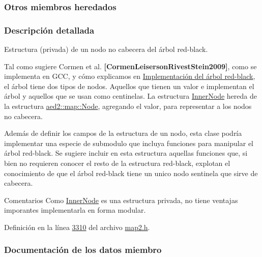 \subsubsection*{Otros miembros heredados}


\subsubsection{Descripción detallada}
Estructura (privada) de un nodo no cabecera del árbol red-\/black. 

Tal como sugiere Cormen et al. {\bfseries [Cormen\+Leiserson\+Rivest\+Stein2009]}, como se implementa en G\+CC, y cómo explicamos en \hyperlink{Implementacion}{Implementación del árbol red-\/black}, el árbol tiene dos tipos de nodos. Aquellos que tienen un valor e implementan el árbol y aquellos que se usan como centinelas. La estructura \hyperlink{structaed2_1_1iterator_1_1InnerNode}{Inner\+Node} hereda de la estructura \hyperlink{structaed2_1_1map_1_1Node}{aed2\+::map\+::\+Node}, agregando el valor, para representar a los nodos no cabecera.

Además de definir los campos de la estructura de un nodo, esta clase podría implementar una especie de submodulo que incluya funciones para manipular el árbol red-\/black. Se sugiere incluir en esta estructura aquellas funciones que, si bien no requieren conocer el resto de la estructura red-\/black, explotan el conocimiento de que el árbol red-\/black tiene un unico nodo sentinela que sirve de cabecera.

\begin{DoxyRemark}{Comentarios}
Como \hyperlink{structaed2_1_1iterator_1_1InnerNode}{Inner\+Node} es una estructura privada, no tiene ventajas imporantes implementarla en forma modular. 
\end{DoxyRemark}


Definición en la línea \hyperlink{map2_8h_source_l03310}{3310} del archivo \hyperlink{map2_8h_source}{map2.\+h}.



\subsubsection{Documentación de los datos miembro}
\mbox{\label{structaed2_1_1iterator_1_1InnerNode_a3d80723a2dd1b746c0687f39fbc3d5e2_a3d80723a2dd1b746c0687f39fbc3d5e2}} 
